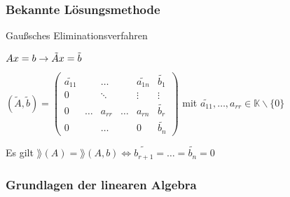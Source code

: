 \subsubsection{Bekannte Lösungsmethode} Gaußsches Eliminationsverfahren

$Ax=b \rightarrow \tilde{A}x= \tilde{b} \\$

$(\tilde{A},\tilde{b})=
\begin{pmatrix}
\widetilde{a_{11}} & &\dots  &  & \widetilde{a_{1n}} & \widetilde{b_1} \\
0 & & \ddots &  & \vdots & \vdots \\
0 & \dots & a_{rr} & \dots & a_{rn} & \widetilde{b_r} \\
0 & & \dots & & 0 & \widetilde{b_n} \end{pmatrix} $
mit $\widetilde{a_{11}}, \dots, a_{rr} \in \mathbb{K} \backslash \{0\} $

Es gilt $\rang(A)= \rang (A,b) \Leftrightarrow
\widetilde{b_{r+1}} = \dots = \widetilde{b_n} = 0 $

\subsubsection{Grundlagen der linearen Algebra}

